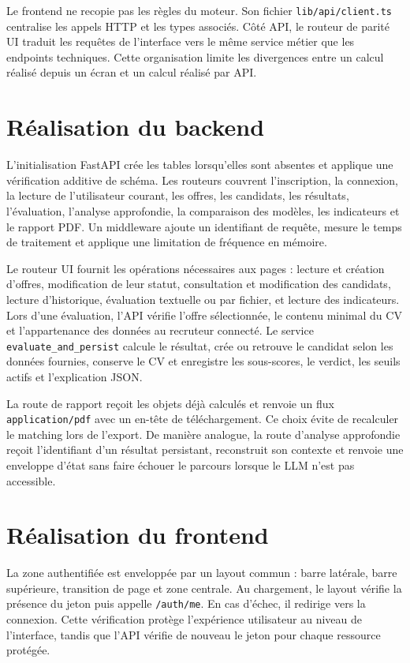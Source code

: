 Le frontend ne recopie pas les règles du moteur. Son fichier \texttt{lib/api/client.ts} centralise les appels HTTP et les types associés. Côté API, le routeur de parité UI traduit les requêtes de l'interface vers le même service métier que les endpoints techniques. Cette organisation limite les divergences entre un calcul réalisé depuis un écran et un calcul réalisé par API.

\section{Réalisation du backend}

L'initialisation FastAPI crée les tables lorsqu'elles sont absentes et applique une vérification additive de schéma. Les routeurs couvrent l'inscription, la connexion, la lecture de l'utilisateur courant, les offres, les candidats, les résultats, l'évaluation, l'analyse approfondie, la comparaison des modèles, les indicateurs et le rapport PDF. Un middleware ajoute un identifiant de requête, mesure le temps de traitement et applique une limitation de fréquence en mémoire.

Le routeur UI fournit les opérations nécessaires aux pages : lecture et création d'offres, modification de leur statut, consultation et modification des candidats, lecture d'historique, évaluation textuelle ou par fichier, et lecture des indicateurs. Lors d'une évaluation, l'API vérifie l'offre sélectionnée, le contenu minimal du CV et l'appartenance des données au recruteur connecté. Le service \texttt{evaluate\_and\_persist} calcule le résultat, crée ou retrouve le candidat selon les données fournies, conserve le CV et enregistre les sous-scores, le verdict, les seuils actifs et l'explication JSON.

La route de rapport reçoit les objets déjà calculés et renvoie un flux \texttt{application/pdf} avec un en-tête de téléchargement. Ce choix évite de recalculer le matching lors de l'export. De manière analogue, la route d'analyse approfondie reçoit l'identifiant d'un résultat persistant, reconstruit son contexte et renvoie une enveloppe d'état sans faire échouer le parcours lorsque le LLM n'est pas accessible.

\section{Réalisation du frontend}

La zone authentifiée est enveloppée par un layout commun : barre latérale, barre supérieure, transition de page et zone centrale. Au chargement, le layout vérifie la présence du jeton puis appelle \texttt{/auth/me}. En cas d'échec, il redirige vers la connexion. Cette vérification protège l'expérience utilisateur au niveau de l'interface, tandis que l'API vérifie de nouveau le jeton pour chaque ressource protégée.

